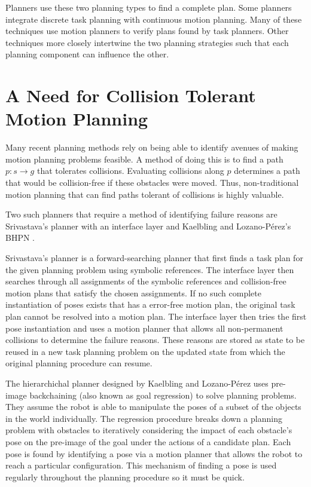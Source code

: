 Planners use these two planning types to find a complete plan. Some planners integrate discrete task planning with continuous motion planning. Many of these techniques use motion planners to verify plans found by task planners. Other techniques more closely intertwine the two planning strategies such that each planning component can influence the other. 

\section{A Need for Collision Tolerant Motion Planning} \label{intro:collisiontolerant}
Many recent planning methods rely on being able to identify avenues of making motion planning problems feasible. A method of doing this is to find a path $p:s \rightarrow g$ that tolerates collisions. Evaluating collisions along $p$ determines a path that would be collision-free if these obstacles were moved. Thus, non-traditional motion planning that can find paths tolerant of collisions is highly valuable. 

Two such planners that require a method of identifying failure reasons are Srivastava's planner with an interface layer and Kaelbling and Lozano-P\'{e}rez's BHPN \cite{kaelbling_tlp:preimage} \cite{srivastava:interface}. 

Srivastava's planner is a forward-searching planner that first finds a task plan for the given planning problem using symbolic references. The interface layer then searches through all assignments of the symbolic references and collision-free motion plans that satisfy the chosen assignments. If no such complete instantiation of poses exists that has a error-free motion plan, the original task plan cannot be resolved into a motion plan. The interface layer then tries the first pose instantiation and uses a motion planner that allows all non-permanent collisions to determine the failure reasons. These reasons are stored as state to be reused in a new task planning problem on the updated state from which the original planning procedure can resume. 

The hierarchichal planner designed by Kaelbling and Lozano-P\'{e}rez uses pre-image backchaining (also known as goal regression) to solve planning problems. They assume the robot is able to manipulate the poses of a subset of the objects in the world individually. The regression procedure breaks down a planning problem with obstacles to iteratively considering the impact of each obstacle's pose on the pre-image of the goal under the actions of a candidate plan. Each pose is found by identifying a pose via a motion planner that allows the robot to reach a particular configuration. This mechanism of finding a pose is used regularly throughout the planning procedure so it must be quick.

